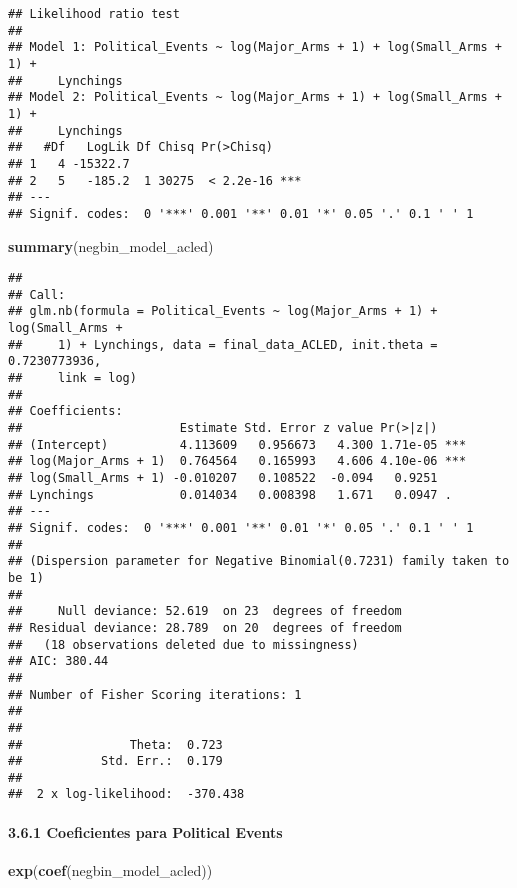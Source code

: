 \documentclass[
  11pt,
]{article}
\newenvironment{Shaded}{\begin{snugshade}}{\end{snugshade}}
\newcommand{\FunctionTok}[1]{\textcolor[rgb]{0.13,0.29,0.53}{\textbf{#1}}}
\newcommand{\NormalTok}[1]{#1}
\begin{document}
\begin{verbatim}
## Likelihood ratio test
## 
## Model 1: Political_Events ~ log(Major_Arms + 1) + log(Small_Arms + 1) + 
##     Lynchings
## Model 2: Political_Events ~ log(Major_Arms + 1) + log(Small_Arms + 1) + 
##     Lynchings
##   #Df   LogLik Df Chisq Pr(>Chisq)    
## 1   4 -15322.7                        
## 2   5   -185.2  1 30275  < 2.2e-16 ***
## ---
## Signif. codes:  0 '***' 0.001 '**' 0.01 '*' 0.05 '.' 0.1 ' ' 1
\end{verbatim}

\begin{Shaded}
\begin{Highlighting}[]
\FunctionTok{summary}\NormalTok{(negbin\_model\_acled)}
\end{Highlighting}
\end{Shaded}

\begin{verbatim}
## 
## Call:
## glm.nb(formula = Political_Events ~ log(Major_Arms + 1) + log(Small_Arms + 
##     1) + Lynchings, data = final_data_ACLED, init.theta = 0.7230773936, 
##     link = log)
## 
## Coefficients:
##                      Estimate Std. Error z value Pr(>|z|)    
## (Intercept)          4.113609   0.956673   4.300 1.71e-05 ***
## log(Major_Arms + 1)  0.764564   0.165993   4.606 4.10e-06 ***
## log(Small_Arms + 1) -0.010207   0.108522  -0.094   0.9251    
## Lynchings            0.014034   0.008398   1.671   0.0947 .  
## ---
## Signif. codes:  0 '***' 0.001 '**' 0.01 '*' 0.05 '.' 0.1 ' ' 1
## 
## (Dispersion parameter for Negative Binomial(0.7231) family taken to be 1)
## 
##     Null deviance: 52.619  on 23  degrees of freedom
## Residual deviance: 28.789  on 20  degrees of freedom
##   (18 observations deleted due to missingness)
## AIC: 380.44
## 
## Number of Fisher Scoring iterations: 1
## 
## 
##               Theta:  0.723 
##           Std. Err.:  0.179 
## 
##  2 x log-likelihood:  -370.438
\end{verbatim}

\paragraph{3.6.1 Coeficientes para Political
Events}\label{coeficientes-para-political-events}

\begin{Shaded}
\begin{Highlighting}[]
\FunctionTok{exp}\NormalTok{(}\FunctionTok{coef}\NormalTok{(negbin\_model\_acled))}
\end{Highlighting}
\end{Shaded}
\end{document}
